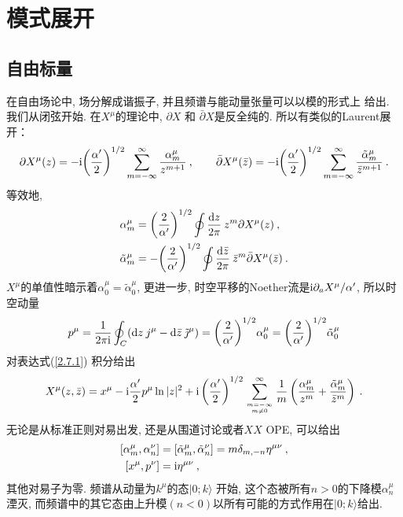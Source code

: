 \section{\texorpdfstring{模式展开}{2.7 Mode expansions}} \label{sec:2.7}

\subsection*{自由标量}
在自由场论中, 场分解成谐振子, 并且频谱与能动量张量可以以模的形式上
给出. 我们从闭弦开始. 在$X^\mu$的理论中,  $\partial X$ 和 $\bar{\partial} X$是反全纯的. 所以有类似的Laurent展开：
\begin{equation}\label{2.7.1}
\partial X^{\mu}(z)=-\mathrm{i}\biggl(\frac{\alpha^{\prime}}{2}\biggr)^{1 / 2} \sum_{m=-\infty}^{\infty} \frac{\alpha_{m}^{\mu}}{z^{m+1}}\:, \qquad 
\bar{\partial} X^{\mu}(\bar{z})=-\mathrm{i}\biggl(\frac{\alpha^{\prime}}{2}\biggr)^{1 / 2} \sum_{m=-\infty}^{\infty} \frac{\tilde{\alpha}_{m}^{\mu}}{\bar{z}^{m+1}} \:.
\end{equation}
等效地, 
\begin{subequations}\label{2.7.2}
\begin{align}
\alpha_{m}^{\mu}&=\biggl(\frac{2}{\alpha^{\prime}}\biggr)^{1 / 2} \oint \frac{\mathrm{d} z}{2 \pi}\: z^{m} \partial X^{\mu}(z) \:, \label{2.7.2a} \\
\tilde{\alpha}_{m}^{\mu}&=-\biggl(\frac{2}{\alpha^{\prime}}\biggr)^{1 / 2} \oint \frac{\mathrm{d} \bar{z}}{2 \pi} \: \bar{z}^{m} \bar{\partial} X^{\mu}(\bar{z}) \:. \label{2.7.2b}
\end{align}
\end{subequations}
$X^\mu$的单值性暗示着$\alpha_{0}^{\mu}=\tilde{\alpha}_{0}^{\mu}$, 更进一步, 时空平移的Noether流是$\mathrm{i} \partial_{a} X^{\mu} / \alpha^{\prime}$, 
所以时空动量
\begin{equation}\label{2.7.3}
p^{\mu}=\frac{1}{2 \pi \mathrm{i}} \oint_{C} (\mathrm{d} z \: j^{\mu}-\mathrm{d} \bar{z}\: \tilde{\jmath}^{\mu})
=\biggl(\frac{2}{\alpha^{\prime}}\biggr)^{1 / 2} \alpha_{0}^{\mu}=\biggl(\frac{2}{\alpha^{\prime}}\biggr)^{1 / 2} \tilde{\alpha}_{0}^{\mu}
\end{equation}
对表达式(\ref{2.7.1}) 积分给出
\begin{equation}
X^{\mu}(z, \bar{z})=x^{\mu}- \mathrm{i} \frac{\alpha^{\prime}}{2} p^{\mu} \ln |z|^{2}+\mathrm{i}\left(\frac{\alpha^{\prime}}{2}\right)^{1 / 2} \sum_{m=-\infty \atop m \neq 0}^{\infty} \frac{1}{m}\left(\frac{\alpha_{m}^{\mu}}{z^{m}}+\frac{\tilde{\alpha}_{m}^{\mu}}{\bar{z}^{m}}\right) \:.
\end{equation}
无论是从标准正则对易出发, 还是从围道讨论或者$XX$ OPE, 可以给出
\begin{subequations} \label{2.7.5}
\begin{align}
[\alpha_{m}^{\mu}, \alpha_{n}^{\nu}] &= [\tilde{\alpha}_{m}^{\mu}, \tilde{\alpha}_{n}^{\nu}]=m \delta_{m,-n} \eta^{\mu \nu} \:, \label{2.7.5a} \\
[x^{\mu}, p^{\nu}] &= \mathrm{i} \eta^{\mu \nu} \:, \label{2.7.5b}  
\end{align}
\end{subequations}
其他对易子为零. 频谱从动量为$k^\mu$的态$\lvert 0 ; k\rangle$ 开始, 这个态被所有$n>0$的下降模$\alpha_n^\mu$湮灭, 而频谱中的其它态由上升模$(n<0)$以所有可能的方式作用在$\lvert 0 ; k\rangle$给出. 

